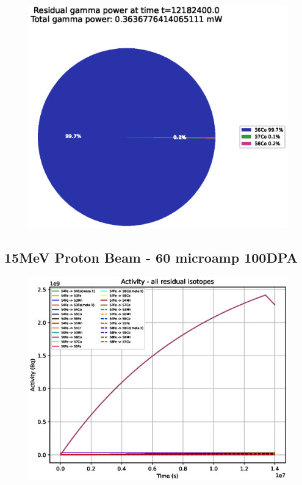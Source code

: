 \begin{figure}[!htb]
\centering
\includegraphics[width=0.7\linewidth]{chapters/activity_code/fe_100dpa/endofbeam/10MeV_0500_12182400.eps}
\caption{}
\label{fig:5mev-proton-100dpa}
\end{figure}



\clearpage
\FloatBarrier
\subsection{15MeV Proton Beam - 60 microamp 100DPA}

\begin{figure}[!htb]
\centering
\includegraphics[width=0.7\linewidth]{chapters/activity_code/fe_100dpa/by_isotope/15MeV_all_radioactive_isotopes.eps}
\caption{}
\label{fig:5mev-proton-100dpa-activity}
\end{figure}

